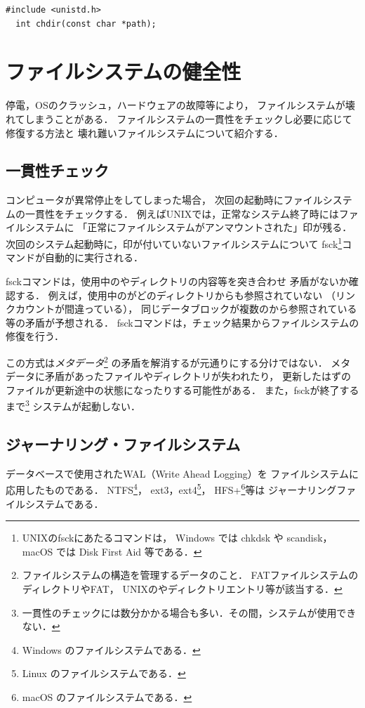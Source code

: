 \begin{lstlisting}[numbers=none]
  #include <unistd.h>
  int chdir(const char *path);
\end{lstlisting}

\section{ファイルシステムの健全性}
停電，OSのクラッシュ，ハードウェアの故障等により，
ファイルシステムが壊れてしまうことがある．
ファイルシステムの一貫性をチェックし必要に応じて修復する方法と
壊れ難いファイルシステムについて紹介する．

\subsection{一貫性チェック}
\label{unmountFlag}
コンピュータが異常停止をしてしまった場合，
次回の起動時にファイルシステムの一貫性をチェックする．
例えばUNIXでは，正常なシステム終了時にはファイルシステムに
「正常にファイルシステムがアンマウントされた」印が残る．
次回のシステム起動時に，印が付いていないファイルシステムについて
fsck\footnote{
UNIXのfsckにあたるコマンドは，
Windows では chkdsk や scandisk，macOS では Disk First Aid 等である．
}コマンドが自動的に実行される．

fsckコマンドは，使用中の\inode やディレクトリの内容等を突き合わせ
矛盾がないか確認する．
例えば，使用中の\inode がどのディレクトリからも参照されていない
（リンクカウントが間違っている），
同じデータブロックが複数の\inode から参照されている等の矛盾が予想される．
fsckコマンドは，チェック結果からファイルシステムの修復を行う．

この方式は\emph{メタデータ}\footnote{
ファイルシステムの構造を管理するデータのこと．
FATファイルシステムのディレクトリやFAT，
UNIXの\inode やディレクトリエントリ等が該当する．}
の矛盾を解消するが元通りにする分けではない．
メタデータに矛盾があったファイルやディレクトリが失われたり，
更新したはずのファイルが更新途中の状態になったりする可能性がある．
また，fsckが終了するまで\footnote{
一貫性のチェックには数分かかる場合も多い．その間，システムが使用できない．}
システムが起動しない．

\subsection{ジャーナリング・ファイルシステム}
データベースで使用されたWAL（Write Ahead Logging）を
ファイルシステムに応用したものである．
NTFS\footnote{Windows のファイルシステムである．}，
ext3，ext4\footnote{Linux のファイルシステムである．}，
HFS+\footnote{macOS のファイルシステムである．}等は
ジャーナリングファイルシステムである．

